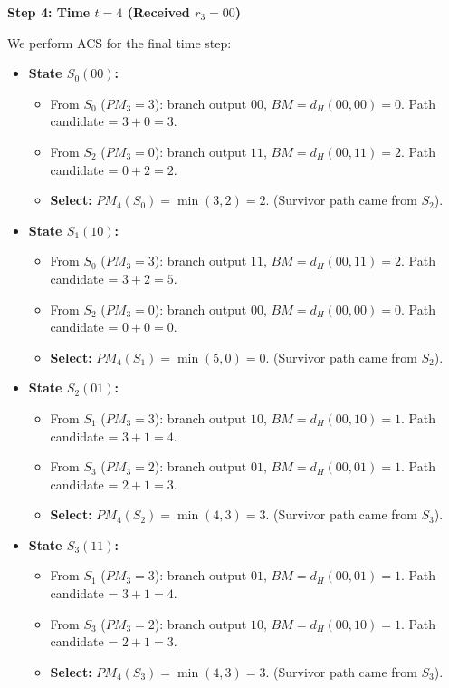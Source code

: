 \documentclass[12pt,a4paper]{article}
\begin{document}
\textbf{Step 4: Time $t=4$ (Received $r_3 = 00$)}\par\noindent
We perform ACS for the final time step:
\begin{itemize}[leftmargin=*, itemsep=3.5pt]
  \item \textbf{State $S_0(00)$:}
    \begin{itemize}[leftmargin=*, itemsep=1pt]
      \item From $S_0$ ($PM_3=3$): branch output $00$, $BM = d_H(00, 00) = 0$. Path candidate = $3 + 0 = 3$.
      \item From $S_2$ ($PM_3=0$): branch output $11$, $BM = d_H(00, 11) = 2$. Path candidate = $0 + 2 = 2$.
      \item \textbf{Select:} $PM_4(S_0) = \min(3, 2) = 2$. (Survivor path came from $S_2$).
    \end{itemize}
  \item \textbf{State $S_1(10)$:}
    \begin{itemize}[leftmargin=*, itemsep=1pt]
      \item From $S_0$ ($PM_3=3$): branch output $11$, $BM = d_H(00, 11) = 2$. Path candidate = $3 + 2 = 5$.
      \item From $S_2$ ($PM_3=0$): branch output $00$, $BM = d_H(00, 00) = 0$. Path candidate = $0 + 0 = 0$.
      \item \textbf{Select:} $PM_4(S_1) = \min(5, 0) = 0$. (Survivor path came from $S_2$).
    \end{itemize}
  \item \textbf{State $S_2(01)$:}
    \begin{itemize}[leftmargin=*, itemsep=1pt]
      \item From $S_1$ ($PM_3=3$): branch output $10$, $BM = d_H(00, 10) = 1$. Path candidate = $3 + 1 = 4$.
      \item From $S_3$ ($PM_3=2$): branch output $01$, $BM = d_H(00, 01) = 1$. Path candidate = $2 + 1 = 3$.
      \item \textbf{Select:} $PM_4(S_2) = \min(4, 3) = 3$. (Survivor path came from $S_3$).
    \end{itemize}
  \item \textbf{State $S_3(11)$:}
    \begin{itemize}[leftmargin=*, itemsep=1pt]
      \item From $S_1$ ($PM_3=3$): branch output $01$, $BM = d_H(00, 01) = 1$. Path candidate = $3 + 1 = 4$.
      \item From $S_3$ ($PM_3=2$): branch output $10$, $BM = d_H(00, 10) = 1$. Path candidate = $2 + 1 = 3$.
      \item \textbf{Select:} $PM_4(S_3) = \min(4, 3) = 3$. (Survivor path came from $S_3$).
    \end{itemize}
\end{itemize}
\end{document}

